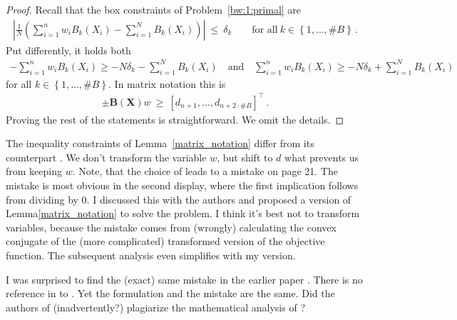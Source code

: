 \begin{proof}
  Recall that the box constraints of Problem~\ref{bw:1:primal} are
  \begin{gather*}
        \left| 
      \frac{1}{N} 
      \left( 
      \sum_{i = 1}^{n} 
      w_i
      B_k(X_i)
      -
      \sum_{i=1}^{N} 
      B_k(X_i)
      \right)
    \right|
    \ 
    \le 
    \ 
    \delta_k
    \qquad
    \text{for all}\ 
    k\in \left\{ 1,\ldots,\# B \right\}
    \,.
  \end{gather*}
  Put differently, it holds both
  \begin{align*}
    -
      \sum_{i = 1}^{n} 
      w_i
      B_k(X_i)
    \ge 
    -
    N
    \delta_k
      -
      \sum_{i=1}^{N} 
      B_k(X_i)
      \quad 
    \text{and}
      \quad
      \sum_{i = 1}^{n} 
      w_i
      B_k(X_i)
    \ge 
    -
    N
    \delta_k
      +
      \sum_{i=1}^{N} 
      B_k(X_i)
  \end{align*}
  for all 
  $
    k\in \left\{ 1,\ldots,\# B \right\}
  $. In matrix notation this is 
  \begin{gather*}
    \pm\mathbf{B}(\mathbf{X})w
    \ 
    \ge
    \ 
    [d_{n+1},\ldots, d_{n+2\cdot\# B}]^\top
    \,.
  \end{gather*}
  Proving the rest of the statements is straightforward. We omit the details.
\end{proof}
\begin{remark}
  The inequality constraints of
  Lemma~\ref{matrix_notation} differ from its counterpart
  \cite[Proof of Lemma~1]{Wang2019}.
  We don't transform the variable $w$, but shift to $d$ what prevents us from keeping $w$.
  Note, that the choice of
  \cite[Proof of Lemma~1]{Wang2019} leads to a mistake on page 21.
  The mistake is most obvious in the second display, where the first implication follows from dividing by 0.
  I discussed this with the authors and proposed a version of Lemma\ref{matrix_notation} to solve the problem. I think it's best not to transform variables, because the mistake comes from (wrongly) calculating the convex conjugate of the (more complicated) transformed version of the objective function. The subsequent analysis even simplifies with my version.

  I was surprised to find the (exact) same mistake in the earlier paper 
  \cite[page 35 second display]{Chan2016}. 
  There is no reference in
  \cite[Proof of Lemma~1]{Wang2019} 
  to
  \cite{Chan2016}. Yet the formulation and the mistake are the same.
  Did the authors of \cite{Wang2019} (inadvertently?) plagiarize
  the mathematical analysis of 
  \cite{Chan2016}
  ?
\end{remark}


